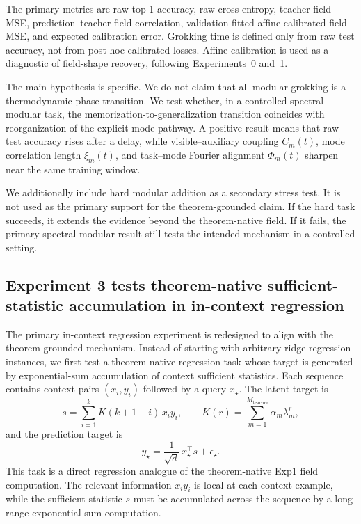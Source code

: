 \documentclass[11pt]{article}
\theoremstyle{definition}
\begin{document}
The primary metrics are raw top-1 accuracy, raw cross-entropy, teacher-field MSE, prediction--teacher-field correlation, validation-fitted affine-calibrated field MSE, and expected calibration error. Grokking time is defined only from raw test accuracy, not from post-hoc calibrated losses. Affine calibration is used as a diagnostic of field-shape recovery, following Experiments~0 and~1.

The main hypothesis is specific. We do not claim that all modular grokking is a thermodynamic phase transition. We test whether, in a controlled spectral modular task, the memorization-to-generalization transition coincides with reorganization of the explicit mode pathway. A positive result means that raw test accuracy rises after a delay, while visible--auxiliary coupling \(C_m(t)\), mode correlation length \(\xi_m(t)\), and task--mode Fourier alignment \(\Phi_m(t)\) sharpen near the same training window.

We additionally include hard modular addition as a secondary stress test. It is not used as the primary support for the theorem-grounded claim. If the hard task succeeds, it extends the evidence beyond the theorem-native field. If it fails, the primary spectral modular result still tests the intended mechanism in a controlled setting.


\subsection*{Experiment 3 tests theorem-native sufficient-statistic accumulation in in-context regression}

The primary in-context regression experiment is redesigned to align with the theorem-grounded mechanism. Instead of starting with arbitrary ridge-regression instances, we first test a theorem-native regression task whose target is generated by exponential-sum accumulation of context sufficient statistics. Each sequence contains context pairs \((x_i,y_i)\) followed by a query \(x_\star\). The latent target is
\begin{equation}
s
=
\sum_{i=1}^{k}
K(k+1-i)\,x_i y_i,
\qquad
K(r)=\sum_{m=1}^{M_{\mathrm{teacher}}}\alpha_m\lambda_m^r,
\label{eq:icr-sufficient-statistic}
\end{equation}
and the prediction target is
\begin{equation}
y_\star
=
\frac{1}{\sqrt d}\,x_\star^\top s + \epsilon_\star .
\label{eq:icr-target}
\end{equation}
This task is a direct regression analogue of the theorem-native Exp1 field computation. The relevant information \(x_i y_i\) is local at each context example, while the sufficient statistic \(s\) must be accumulated across the sequence by a long-range exponential-sum computation.
\end{document}
